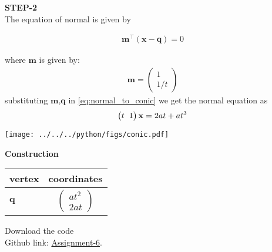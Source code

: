 \documentclass[10pt,a4paper]{report}
\newcommand{\myvec}[1]{\ensuremath{\begin{pmatrix}#1\end{pmatrix}}}
\let\vec\mathbf
\let\vec\mathbf
\begin{document}
\begin{multicols}{2}
 \textbf{STEP-2}\vspace{2mm}\\
The equation of normal is given by
\begin{center}
\begin{align}
\label{eq:normal_to_conic}
\vec{m}^{\top}(\vec{x}-\vec{q})=0
\end{align}
\end{center}
where $\vec{m}$ is given by:
\begin{align}
\vec{m}=\myvec{1\\
1/t}
\end{align}
substituting $\vec{m}$,$\vec{q}$ in \eqref{eq:normal_to_conic} we get the normal equation as\\
\begin{align}
\myvec{t \hspace{2mm} 1} \vec{x}=2at+at^3
\end{align}
\begin{center}
\texttt{[image: ../../../python/figs/conic.pdf]} 
 \end{center}\vspace{1mm}
 
 \vspace{2mm} \textbf{Construction}
\begin{center}
\setlength{\arrayrulewidth}{0.5mm}
\setlength{\tabcolsep}{6pt}
\renewcommand{\arraystretch}{1.5}
    \begin{tabular}{|l|c|}
    \hline 
    \textbf{vertex} & \textbf{coordinates} \\ \hline
  $\vec{q}$ & $\myvec{
   at^2\\
   2at
   } $\\\hline
      \end{tabular}
  \end{center}
  
\raggedright  Download the code \\
Github link: \href{https://github.com/KrishnaYadati/Assignments/blob/main/Matrix_conic_assignment/codes/conic.py}{Assignment-6}.
  \end{multicols}
\end{document}
